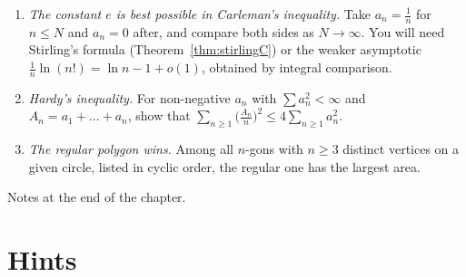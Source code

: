 \begin{challenge}
\begin{enumerate}[label=(\arabic*)]
\item \emph{The constant $e$ is best possible in Carleman's inequality.} Take $a_n=\frac1n$ for $n\le N$ and $a_n=0$ after, and compare both sides as $N\to\infty$. You will need Stirling's formula (Theorem~\ref{thm:stirlingC}) or the weaker asymptotic $\frac1n\ln(n!)=\ln n-1+o(1)$, obtained by integral comparison.
\item \emph{Hardy's inequality.} For non-negative $a_n$ with $\sum a_n^2<\infty$ and $A_n=a_1+\dots+a_n$, show that $\sum_{n\ge1}\bigl(\frac{A_n}n\bigr)^2\le4\sum_{n\ge1}a_n^2$.
\item \emph{The regular polygon wins.} Among all $n$-gons with $n\ge3$ distinct vertices on a given circle, listed in cyclic order, the regular one has the largest area.
\end{enumerate}
Notes at the end of the chapter.
\end{challenge}

\section{Hints}

